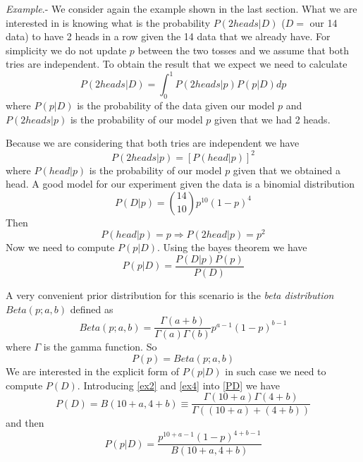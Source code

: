 \documentclass[onecolumn,           %
               showpacs,            %
               preprintnumbers,     %
               aps,                 %
               prl,          	    %
               letterpaper,             %
               superscriptaddress,      %
               nofootinbib,         %
               tightenlines,        %
               floats,floatfix      %
               ,usenatbib,
               ]{revtex4-1}
\begin{document}
\textit{Example}.- We consider again the example shown in the last section. What we are interested in is knowing what is the probability $P(2heads|D)$ ($D=$ our 14 data) to have 2 heads in a row given the 14 data that we already have. For simplicity we do not update $p$ between the two tosses and we assume that both tries are independent. To obtain the result that we expect we need to calculate
\begin{equation}\label{ex}
P(2heads|D)=\int^1_0 P(2heads|p)P(p|D)dp
\end{equation}
where $P(p|D)$ is the probability of the data given our model $p$ and $P(2heads|p)$ is the probability of our model $p$ given that we had 2 heads. 

Because we are considering that both tries are independent we have
\begin{equation}
P(2heads|p)=[P(head|p)]^2
\end{equation}
where $P(head|p)$ is the probability of our model $p$ given that we obtained a head. A good model for our experiment given the data is a binomial distribution
\begin{equation}\label{ex2}
P(D|p)=\binom{14}{10}p^{10}(1-p)^4
\end{equation}
Then 
\begin{equation}\label{ex1}
P(head|p)=p\Rightarrow P(2head|p)=p^2
\end{equation}
Now we need to compute $P(p|D)$. Using the bayes theorem we have
\begin{equation}
P(p|D)=\frac{P(D|p)P(p)}{P(D)}
\end{equation}

A very convenient prior distribution for this scenario is the \textit{beta distribution} $Beta(p;a,b)$ defined as
\begin{equation}\label{ex3}
Beta(p;a,b)=\frac{\Gamma(a+b)}{\Gamma(a)\Gamma(b)}p^{a-1}(1-p)^{b-1}
\end{equation}
where $\Gamma$ is the gamma function. So
\begin{equation}\label{ex4}
P(p)=Beta(p;a,b)
\end{equation}
We are interested in the explicit form of $P(p|D)$ in such case we need to compute $P(D)$. Introducing \eqref{ex2} and \eqref{ex4} into \eqref{PD} we have
\begin{equation}
P(D)=B(10+a,4+b)\equiv \frac{\Gamma(10+a)\Gamma(4+b)}{\Gamma((10+a)+(4+b))}
\end{equation}
and then
\begin{equation}\label{ex4}
P(p|D)=\frac{p^{10+a-1}(1-p)^{4+b-1}}{B(10+a,4+b)}
\end{equation}
\end{document}
